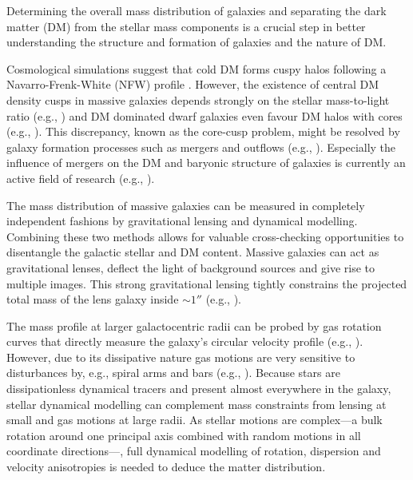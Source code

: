 \documentclass[useAMS,usenatbib]{mnras}
\begin{document}
Determining the overall mass distribution of galaxies and separating the dark matter (DM) from the stellar mass components is a crucial step in better understanding the structure and formation of galaxies and the nature of DM.

Cosmological simulations suggest that cold DM forms cuspy halos following a Navarro-Frenk-White (NFW) profile \citep{1996ApJ...462..563N}. However, the existence of central DM density cusps in massive galaxies depends strongly on the stellar mass-to-light ratio (e.g., \citealt{2011MNRAS.416..322D}) and DM dominated dwarf galaxies even favour DM halos with cores (e.g., \citealt{1994Natur.370..629M,2001ApJ...552L..23D}). This discrepancy, known as the core-cusp problem, might be resolved by galaxy formation processes such as mergers and outflows (e.g., \citealt{2001ApJ...560..636E,2012MNRAS.421.3464P}). Especially the influence of mergers on the DM and baryonic structure of galaxies is currently an active field of research (e.g., \citealt{2009ApJ...697L..38J,2010ApJ...712...88L,2012MNRAS.425.3119H,2015MNRAS.453.2447D}).

The mass distribution of massive galaxies can be measured in completely independent fashions by gravitational lensing and dynamical modelling. Combining these two methods allows for valuable cross-checking opportunities to disentangle the galactic stellar and DM content. Massive galaxies can act as gravitational lenses, deflect the light of background sources and give rise to multiple images. This strong gravitational lensing tightly constrains the projected total mass of the lens galaxy inside $\sim 1''$ (e.g., \citealt{2010ARA&A..48...87T}). 

The mass profile at larger galactocentric radii can be probed by gas rotation curves that directly measure the galaxy's circular velocity profile (e.g., \citealt{1980ApJ...238..471R}). However, due to its dissipative nature gas motions are very sensitive to disturbances by, e.g., spiral arms and bars (e.g., \citealt{2004dad..book.....S}). Because stars are dissipationless dynamical tracers and present almost everywhere in the galaxy, stellar dynamical modelling can complement mass constraints from lensing at small and gas motions at large radii. As stellar motions are complex---a bulk rotation around one principal axis combined with random motions in all coordinate directions---\citep{2008gady.book.....B}, full dynamical modelling of rotation, dispersion and velocity anisotropies is needed to deduce the matter distribution.
\end{document}
